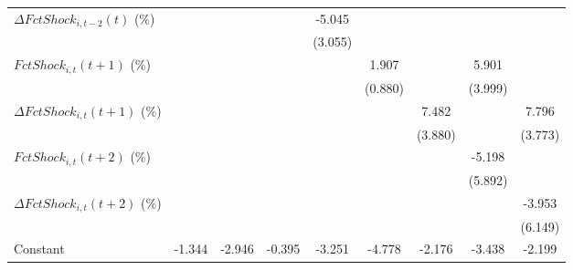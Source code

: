{\begin{tabular}{l*{8}{c}}
\addlinespace
$ \Delta FctShock_{i,t-2}(t)$ (\%)&                     &                     &                     &      -5.045         &                     &                     &                     &                     \\
                    &                     &                     &                     &     (3.055)         &                     &                     &                     &                     \\
\addlinespace
$ FctShock_{i,t}(t+1)$ (\%)&                     &                     &                     &                     &       1.907\sym{**} &                     &       5.901         &                     \\
                    &                     &                     &                     &                     &     (0.880)         &                     &     (3.999)         &                     \\
\addlinespace
$ \Delta FctShock_{i,t}(t+1)$ (\%)&                     &                     &                     &                     &                     &       7.482\sym{*}  &                     &       7.796\sym{*}  \\
                    &                     &                     &                     &                     &                     &     (3.880)         &                     &     (3.773)         \\
\addlinespace
$ FctShock_{i,t}(t+2)$ (\%)&                     &                     &                     &                     &                     &                     &      -5.198         &                     \\
                    &                     &                     &                     &                     &                     &                     &     (5.892)         &                     \\
\addlinespace
$ \Delta FctShock_{i,t}(t+2)$ (\%)&                     &                     &                     &                     &                     &                     &                     &      -3.953         \\
                    &                     &                     &                     &                     &                     &                     &                     &     (6.149)         \\
\addlinespace
Constant            &      -1.344         &      -2.946\sym{***}&      -0.395         &      -3.251\sym{***}&      -4.778\sym{***}&      -2.176\sym{***}&      -3.438         &      -2.199\sym{***}\\

\end{tabular}}
